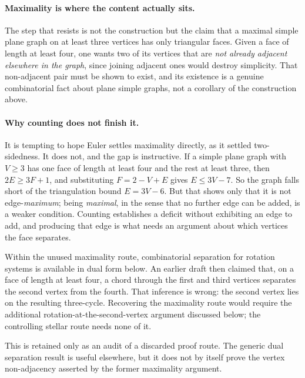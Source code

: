 \paragraph{Maximality is where the content actually sits.}
The step that resists is not the construction but the claim that a maximal
simple plane graph on at least three vertices has only triangular faces.
Given a face of length at least four, one wants two of its vertices that are
\emph{not already adjacent elsewhere in the graph}, since joining adjacent
ones would destroy simplicity. That non-adjacent pair must be shown to exist,
and its existence is a genuine combinatorial fact about plane simple graphs,
not a corollary of the construction above.

\paragraph{Why counting does not finish it.}
It is tempting to hope Euler settles maximality directly, as it settled
two-sidedness. It does not, and the gap is instructive. If a simple plane
graph with $V \ge 3$ has one face of length at least four and the rest at
least three, then $2E \ge 3F + 1$, and substituting $F = 2 - V + E$ gives
$E \le 3V - 7$. So the graph falls short of the triangulation bound
$E = 3V - 6$. But that shows only that it is not edge-\emph{maximum}; being
\emph{maximal}, in the sense that no further edge can be added, is a weaker
condition. Counting establishes a deficit without exhibiting an edge to add,
and producing that edge is what needs an argument about which vertices the
face separates.

\begin{remark}
\Sprose
Within the unused maximality route, combinatorial separation for rotation
systems is available in dual form below.  An earlier draft then claimed that,
on a face of length at least four, a chord through the first and third
vertices separates the second vertex from the fourth.  That inference is
wrong: the second vertex lies on the resulting three-cycle.  Recovering the
maximality route would require the additional rotation-at-the-second-vertex
argument discussed below; the controlling stellar route needs none of it.

This is retained only as an audit of a discarded proof route.  The generic
dual separation result is useful elsewhere, but it does not by itself prove
the vertex non-adjacency asserted by the former maximality argument.
\end{remark}

